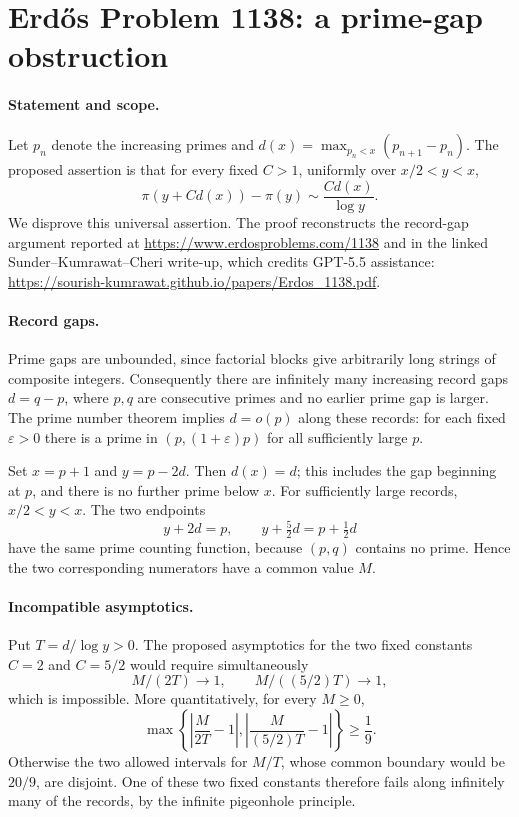 \section*{Erd\H{o}s Problem 1138: a prime-gap obstruction}

\paragraph{Statement and scope.}
Let \(p_n\) denote the increasing primes and
\(d(x)=\max_{p_n<x}(p_{n+1}-p_n)\).
The proposed assertion is that for every fixed \(C>1\), uniformly over \(x/2<y<x\),
\[
 \pi(y+Cd(x))-\pi(y)\sim \frac{Cd(x)}{\log y}.
\]
We disprove this universal assertion. The proof reconstructs the record-gap argument reported at \url{https://www.erdosproblems.com/1138} and in the linked Sunder--Kumrawat--Cheri write-up, which credits GPT-5.5 assistance:
\url{https://sourish-kumrawat.github.io/papers/Erdos_1138.pdf}.

\paragraph{Record gaps.}
Prime gaps are unbounded, since factorial blocks give arbitrarily long strings of composite integers. Consequently there are infinitely many increasing record gaps \(d=q-p\), where \(p,q\) are consecutive primes and no earlier prime gap is larger. The prime number theorem implies \(d=o(p)\) along these records: for each fixed \(\varepsilon>0\) there is a prime in \((p,(1+\varepsilon)p)\) for all sufficiently large \(p\).

Set \(x=p+1\) and \(y=p-2d\). Then \(d(x)=d\); this includes the gap beginning at \(p\), and there is no further prime below \(x\). For sufficiently large records, \(x/2<y<x\).
The two endpoints
\[
 y+2d=p,\qquad y+\tfrac52d=p+\tfrac12d
\]
have the same prime counting function, because \((p,q)\) contains no prime. Hence the two corresponding numerators have a common value \(M\).

\paragraph{Incompatible asymptotics.}
Put \(T=d/\log y>0\). The proposed asymptotics for the two fixed constants \(C=2\) and \(C=5/2\) would require simultaneously
\[
 M/(2T)\longrightarrow1,\qquad M/((5/2)T)\longrightarrow1,
\]
which is impossible. More quantitatively, for every \(M\geq0\),
\[
 \max\left\{\left|\frac{M}{2T}-1\right|,
              \left|\frac{M}{(5/2)T}-1\right|\right\}\geq\frac19.
\]
Otherwise the two allowed intervals for \(M/T\), whose common boundary would be \(20/9\), are disjoint. One of these two fixed constants therefore fails along infinitely many of the records, by the infinite pigeonhole principle.

